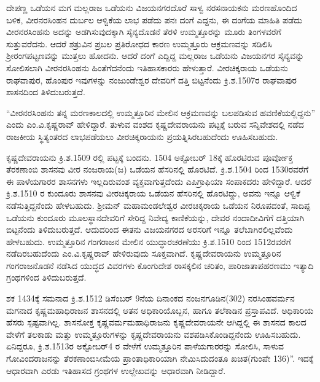 ದೇಪಣ್ಣ ಒಡೆಯನ ಮಗ ಮಲ್ಲರಾಜ ಒಡೆಯನು ವಿಜಯನಗರದೊರೆ ಸಾಳ್ವ ನರಸನಾಯಕನು ಮರಣಹೊಂದಿದ ಬಳಿಕ, ವೀರನರಸಿಂಹನ ದುರ್ಬಲ ಆಳ್ವಿಕೆಯ ಲಾಭ ಪಡೆದು ಪನಃ ದಂಗೆ ಎದ್ದನು, ಈ ದಂಗೆಯ ಮಾಹಿತಿ ಪಡೆದು ವೀರನರಸಿಂಹನು ಅದನ್ನು ಅಡಗಿಸುವುದಕ್ಕಾಗಿ ಸೈನ್ಯದೊಡನೆ ತೆರಳಿ ಉಮ್ಮತ್ತೂರನ್ನು ಮೂರು ತಿಂಗಳವರೆಗೆ ಸುತ್ತುವರೆದನು. ಆದರೆ ಶತ್ರುವಿನ ಪ್ರಬಲ ಪ್ರತಿರೋಧದ ಕಾರಣ ಉಮ್ಮತ್ತೂರು ಆಕ್ರಮಣವನ್ನು ಸಡಿಲಿಸಿ ಶ‍್ರೀರಂಗಪಟ್ಟಣವನ್ನು ಮುತ್ತಲು ಹೋದನು. ಆದರೆ ದಂಗೆ ಎದ್ದಿದ್ದ ಮಲ್ಲರಾಜ ಒಡೆಯನು ವಿಜಯನಗರ ಸೈನ್ಯವನ್ನು ಸೋಲಿಸಲಾಗಿ ವೀರನರಸಿಂಹನು ಹಿಂತೆಗೆದನೆಂದು ಇತಿಹಾಸಕಾರರು ಹೇಳುತ್ತಾರೆ. ವೀರಚಿಕ್ಕರಾಯ ಒಡೆಯನು ರಾಘವಾಪುರ, ಹೊಂಪುರ ಇವುಗಳನ್ನು ನಂಜುಂಡೇಶ್ವರ ದೇವರಿಗೆ ದತ್ತಿ ಬಿಟ್ಟನೆಂದು ಕ್ರಿ.ಶ.1507ರ ರಾಘವಾಪುರ ಶಾಸನದಿಂದ ತಿಳಿದುಬರುತ್ತದೆ.

“ವೀರನರಸಿಂಹನು ತನ್ನ ಮರಣಕಾಲದಲ್ಲಿ ಉಮ್ಮತ್ತೂರಿನ ಮೇಲಿನ ಆಕ್ರಮಣವನ್ನು ಬಲಪಡಿಸುವ ಹವಣಿಕೆಯಲ್ಲಿದ್ದನು” ಎಂದು ಎಂ.ವಿ.ಕೃಷ್ಣರಾವ್​ ಹೇಳಿದ್ದಾರೆ. ತುಳುವ ವಂಶದ ಕೃಷ್ಣದೇವರಾಯನು ಪಟ್ಟಕ್ಕೆ ಬರುವ ಸನ್ನಿವೇಶದಲ್ಲಿ ನಡೆದ ರಾಜಕೀಯ ಸ್ಥಿತ್ಯಂತರದ ಲಾಭಪಡೆಯಲು ವೀರಚಿಕ್ಕರಾಯನು ಪ್ರಯತ್ನಿಸಿರಬಹುದೆಂದು ಊಹಿಸಬಹುದು.

ಕೃಷ್ಣದೇವರಾಯನು ಕ್ರಿ.ಶ.1509 ರಲ್ಲಿ ಪಟ್ಟಕ್ಕೆ ಬಂದನು. 1504 ಅಕ್ಟೋಬರ್​ 18ಕ್ಕೆ ಹೊರಟಿರುವ ಪೂರ್ವೋಕ್ತ ತೆರಕಣಾಂಬಿ ಶಾಸನವು ವೀರ ನಂಜರಾಯ(ಜ) ಒಡೆಯನ ಹೆಸರಿನಲ್ಲಿ ಹೊರಟಿದೆ. ಕ್ರಿ.ಶ.1504 ರಿಂದ 1530ರವರೆಗೆ ಈ ಪಾಳೆಯಗಾರರ ಶಾಸನಗಳು ಇಲ್ಲದಿರುವಂಶ ವ್ಯಕ್ತವಾಗುತ್ತದೆಂದು ಎಪಿಗ್ರಾಫಿಯಾ ಸಂಪಾಕದರು ಹೇಳಿದ್ದಾರೆ. ಆದರೆ ಕ್ರಿ.ಶ.1510 ರ ಕುಂದೂರು ಶಾಸನವು ವೀರಚಿಕ್ಕರಾಯ ಒಡೆಯನ ಹೆಸರಿನಲ್ಲಿ ಹೊರಟಿದ್ದು, ಅವನು ಇನ್ನೂ ಆಳ್ವಿಕೆ ನಡೆಸುತ್ತಿದ್ದನೆಂದು ಹೇಳಬಹುದು. ಶ‍್ರೀಮನ್​ ಮಹಾಮಂಡಲೇಶ್ವರ ವೀರಚಿಕ್ಕರಾಯ ಒಡೆಯನ ನಿರೂಪದಂತೆ, ಸಾದಿಪ್ಪ ಒಡೆಯನು ಕುಂದೂರು ಮೂಲಸ್ಥಾನದೇವರಿಗೆ ಸೇರಿದ್ದ ನಿವೇದ್ಯ ಕಾಣಿಕೆಯನ್ನು, ದೇವರ ನಂದಾದೀವಿಗೆಗೆ ದತ್ತಿಯಾಗಿ ಬಿಟ್ಟನೆಂದು ತಿಳಿದುಬರುತ್ತದೆ. ಆದುದರಿಂದ ಈತನು ವಿಜಯನಗರದ ಅರಸರಿಗೆ ಇನ್ನೂ ತಲೆಬಾಗಿರಲಿಲ್ಲವೆಂದು ಹೇಳಬಹುದು. \textbf{ }ಉಮ್ಮತ್ತೂರಿನ ಗಂಗರಾಜನ ಮೇಲಿನ ಯುದ್ಧಾರಚರಣೆಯು ಕ್ರಿ.ಶ.1510 ರಿಂದ 1512ರವರೆಗೆ ನಡೆದಿರಬಹುದೆಂದು ಎಂ.ವಿ.ಕೃಷ್ಣರಾವ್​ ಹೇಳಿರುವುದು ಸೂಕ್ತವಾಗಿದೆ. ಕೃಷ್ಣದೇವರಾಯನು ಉಮ್ಮತ್ತೂರಿನ ಗಂಗರಾಜನೊಡನೆ ನಡೆಸಿದ ಯುದ್ಧದ ವಿವರಗಳು ಕೊಂಗುದೇಶ ರಾಸಕ್ಕಲಿನ ಚರಿತಂ, ಪಾರಿಜಾತಾಪಹರಣಮು ಇತ್ಯಾದಿ ಗ್ರಂಥಗಳಿಂದ ತಿಳಿದುಬರುತ್ತದೆ.

ಶಕ 1434ಕ್ಕೆ ಸಮನಾದ ಕ್ರಿ.ಶ.1512 ಡಿಸೆಂಬರ್​ 9ನೆಯ ದಿನಾಂಕದ ನಂಜನಗೂಡಿನ(302) ನರಸಿಂಹವರ್ಮನ ಮಗನಾದ ಕೃಷ್ಣಮಹಾಧಿರಾಜನ ಶಾಸನದಲ್ಲಿ ಆತನ ಅಧಿಕಾರಿಯೊಬ್ಬನ, ಹಾಗೂ ತಲೆಕಾಡಿನ ಪ್ರಸ್ತಾಪವಿದೆ. ಅಧಿಕಾರಿಯ ಹೆಸರು ಸ್ಪಷ್ಟವಾಗಿಲ್ಲ. ಶಾಸನೋಕ್ತ ಕೃಷ್ಣವರ್ಮಮಹಾಧಿರಾಜನು ಕೃಷ್ಣದೇವರಾಯನೇ ಆಗಿದ್ದಲ್ಲಿ ಈ ಶಾಸನದ ಕಾಲದ ವೇಳೆಗೆ ತಲಕಾಡು ಮತ್ತು ಉಮ್ಮತ್ತೂರುಗಳನ್ನು ಕೃಷ್ಣದೇವರಾಯನು ವಶಪಡಿಸಿಕೊಂಡಿದ್ದನೆಂದು ಊಹಿಸಬಹುದು. ಏನಿದ್ದರೂ, ಕ್ರಿ.ಶ.1513ರ ಅಕ್ಟೋಬರ್​4 ರ ವೇಳೆಗೆ ಉಮ್ಮತ್ತೂರಿನ ಪಾಳೆಯಗಾರರನ್ನು ಸೋಲಿಸಿ, ಸಾಳುವ ಗೋವಿಂದರಾಜನನ್ನು ತೆರಕಣಾಂಬಿಸೀಮೆಯ ಪ್ರಾಂತಾಧಿಕಾರಿಯಾಗಿ ನೇಮಿಸಿದುದಂತೂ ಖಚಿತ(ಗುಂಪೇ 136)”. ಇದಕ್ಕೆ ಆಧಾರವಾಗಿ ಎರಡು ಇತಿಹಾಸದ ಗ್ರಂಥಗಳ ಉಲ್ಲೇಖವನ್ನು ಆಧಾರವಾಗಿ ನೀಡಿದ್ದಾರೆ.

